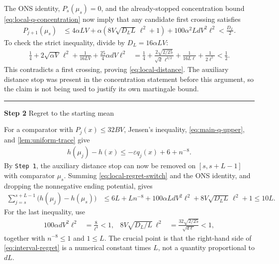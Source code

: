 \documentclass[11pt]{article}
\newcommand{\proofstep}[2]{%
    \par\medskip
    \noindent
    \textcolor{blue!55!black}{\rule{2pt}{1.2em}}%
    \hspace{0.6em}%
    {\sffamily\bfseries\color{blue!55!black}Step #1}%
    \quad
    {\sffamily #2}%
    \par\smallskip
}
\newcommand{\1}{\mathbf 1}
\newcommand{\eps}{\varepsilon}
\begin{document}
The ONS identity, $P_s(\mu_s)=0$, and the already-stopped concentration
bound \eqref{eq:local-q-concentration} now imply that any candidate first
crossing satisfies
\begin{align}
    P_{j+1}(\mu_s)
     & \leq4\alpha LV
    +\alpha\left(8V\sqrt{D_LL}\,\ell^2+1\right)
    +100\alpha^2LdV^2\ell^2
    <\frac{D_L}{2}.
    \label{eq:local-distance-bootstrap}
\end{align}
To check the strict inequality, divide by $D_L=16\alpha LV$:
\begin{align}
    \frac14
    +2\sqrt{\alpha V}\,\ell^2
    +\frac{1}{16LV}
    +\frac{25}{4}\alpha dV\ell^2
     & =\frac14
    +\frac{2\sqrt{2/25}}{\sqrt d\,\ell^{3/2}}
    +\frac{1}{16L\ell}
    +\frac{1}{2\ell^5}
    <\frac12.
\end{align}
This contradicts a first crossing, proving \eqref{eq:local-distance}.
The auxiliary distance stop was present in the concentration statement
before this argument, so the claim is not being used to justify its own
martingale bound.

\proofstep{2}{Regret to the starting mean}
For a comparator with $P_j(x)\leq32BV$, Jensen's inequality,
\eqref{eq:main-q-upper}, and \cref{lem:uniform-trace} give
\begin{align}
    h(\mu_j)-h(x)
    \leq-\eps q_j(x)+6+n^{-8}.
    \label{eq:local-regret-switch}
\end{align}
By \texttt{Step 1}, the auxiliary distance stop can now be removed on
$[s,s+L-1]$ with comparator $\mu_s$. Summing
\eqref{eq:local-regret-switch} and the ONS identity, and dropping the
nonnegative ending potential, gives
\begin{align}
    \sum_{j=s}^{s+L-1}\bigl(h(\mu_j)-h(\mu_s)\bigr)
     & \leq6L+Ln^{-8}
    +100\alpha LdV^2\ell^2
    +8V\sqrt{D_LL}\,\ell^2+1
    \leq10L.
    \label{eq:interval-regret}
\end{align}
For the last inequality, use
\begin{align}
    100\alpha dV^2\ell^2 & =\frac8{\ell^4}<1,
                         & 8V\sqrt{D_L/L}\,\ell^2
                         & =\frac{32\sqrt{2/25}}{\sqrt{d\ell}}<1,
    \label{eq:local-parameter-checks}
\end{align}
together with $n^{-8}\leq1$ and $1\leq L$.
The crucial point is that the right-hand side of
\eqref{eq:interval-regret} is a numerical constant times $L$, not a
quantity proportional to $dL$.
\end{document}
